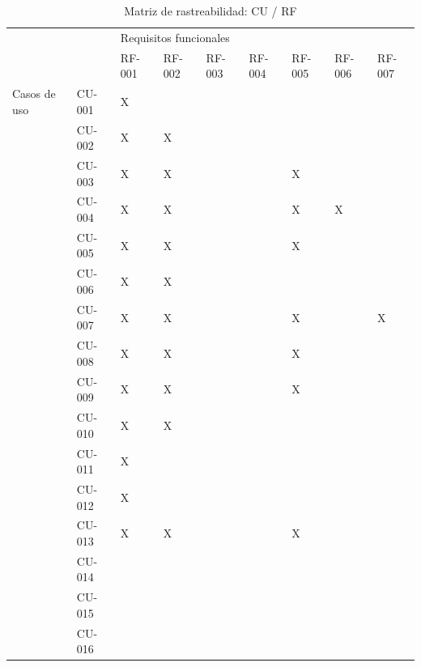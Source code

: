 \begin{table}[htpb]
\centering
\begin{tabularx}{\textwidth}{|l|X|X|X|X|X|X|X|X|}
\hline
\multicolumn{2}{|l|}{\multirow{2}{*}{}} & \multicolumn{7}{l|}{Requisitos funcionales}                  \\ \cline{3-9} 
\multicolumn{2}{|l|}{}                  & RF-001 & RF-002 & RF-003 & RF-004 & RF-005 & RF-006 & RF-007 \\ \hline
Casos de uso             & CU-001       & X      &        &        &        &        &        &        \\ \hline
\multirow{15}{*}{}       & CU-002       & X      & X      &        &        &        &        &        \\ \cline{2-9} 
                         & CU-003       & X      & X      &        &        & X      &        &        \\ \cline{2-9} 
                         & CU-004       & X      & X      &        &        & X      & X      &        \\ \cline{2-9} 
                         & CU-005       & X      & X      &        &        & X      &        &        \\ \cline{2-9} 
                         & CU-006       & X      & X      &        &        &        &        &        \\ \cline{2-9} 
                         & CU-007       & X      & X      &        &        & X      &        & X      \\ \cline{2-9} 
                         & CU-008       & X      & X      &        &        & X      &        &        \\ \cline{2-9} 
                         & CU-009       & X      & X      &        &        & X      &        &        \\ \cline{2-9} 
                         & CU-010       & X      & X      &        &        &        &        &        \\ \cline{2-9} 
                         & CU-011       & X      &        &        &        &        &        &        \\ \cline{2-9} 
                         & CU-012       & X      &        &        &        &        &        &        \\ \cline{2-9} 
                         & CU-013       & X      & X      &        &        & X      &        &        \\ \cline{2-9} 
                         & CU-014       &        &        &        &        &        &        &        \\ \cline{2-9} 
                         & CU-015       &        &        &        &        &        &        &        \\ \cline{2-9} 
                         & CU-016       &        &        &        &        &        &        &        \\ \hline
\end{tabularx}
\caption{Matriz de rastreabilidad: CU / RF}
\label{mat_rast_cu_rf}
\end{table}

